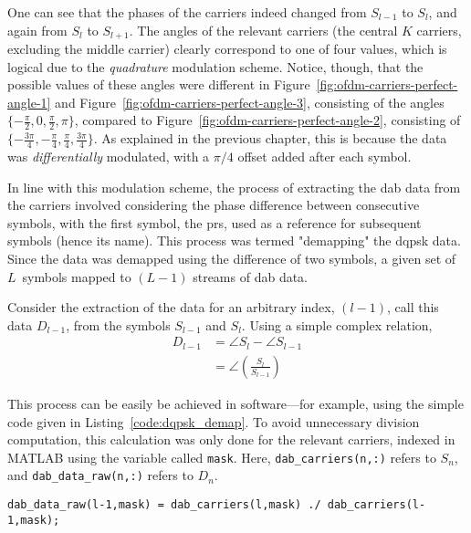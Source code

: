 \documentclass[class=report,11pt,crop=false]{standalone}
\begin{document}
One can see that the phases of the carriers indeed changed from \(S_{l-1}\) to \(S_{l}\), and again from \(S_{l}\) to \(S_{l+1}\). The angles of the relevant carriers (the central \(K\) carriers, excluding the middle carrier) clearly correspond to one of four values, which is logical due to the \emph{quadrature} modulation scheme. Notice, though, that the possible values of these angles were different in Figure~\ref{fig:ofdm-carriers-perfect-angle-1} and Figure~\ref{fig:ofdm-carriers-perfect-angle-3}, consisting of the angles \(\{-\frac{\pi}{2}, 0, \frac{\pi}{2}, \pi\}\), compared to Figure~\ref{fig:ofdm-carriers-perfect-angle-2}, consisting of \(\{-\frac{3\pi}{4}, -\frac{\pi}{4},\frac{\pi}{4}, \frac{3\pi}{4}\}\). As explained in the previous chapter, this is because the data was \emph{differentially} modulated, with a \(\pi/4\) offset added after each symbol.

In line with this modulation scheme, the process of extracting the \gls{dab} data from the carriers involved considering the phase difference between consecutive symbols, with the first symbol, the \gls{prs}, used as a reference for subsequent symbols (hence its name). This process was termed "demapping" the \gls{dqpsk} data. Since the data was demapped using the difference of two symbols, a given set of \(L\)~symbols mapped to \((L-1)\) streams of \gls{dab} data.

Consider the extraction of the data for an arbitrary index, \((l-1)\), call this data \(D_{l-1}\), from the symbols \(S_{l-1}\) and \(S_{l}\). Using a simple complex relation,
\begin{align}
  D_{l-1} &= \angle S_{l} - \angle S_{l-1}\\
          &= \angle\left(\frac{S_{l}}{S_{l-1}}\right)
\end{align}

This process can be easily be achieved in software---for example, using the simple code given in Listing~\ref{code:dqpsk_demap}. To avoid unnecessary division computation, this calculation was only done for the relevant carriers, indexed in MATLAB using the variable called \texttt{mask}. Here, \texttt{dab\_carriers(n,:)} refers to \(S_n\), and \texttt{dab\_data\_raw(n,:)} refers to \(D_n\).

\begin{lstlisting}[caption={MATLAB code for demapping \gls{dab} carriers into \gls{dqpsk} data},label={code:dqpsk_demap}]
dab_data_raw(l-1,mask) = dab_carriers(l,mask) ./ dab_carriers(l-1,mask);
\end{lstlisting}
\end{document}
